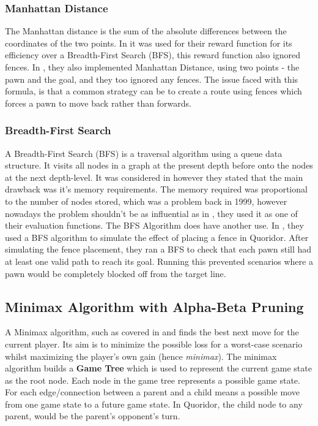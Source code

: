 \documentclass[review]{cmpreport}
\begin{document}
\subsubsection{Manhattan Distance}
The Manhattan distance is the sum of the absolute differences between the coordinates of the two points. In \cite{josequoridor} it was used for their reward function for its efficiency over a Breadth-First Search (BFS), this reward function also ignored fences. In \cite{glendenning2005mastering}, they also implemented Manhattan Distance, using two points - the pawn and the goal, and they too ignored any fences. The issue faced with this formula, is that a common strategy can be to create a route using fences which forces a pawn to move back rather than forwards.

\subsubsection{Breadth-First Search}
A Breadth-First Search (BFS) is a traversal algorithm using a queue data structure. It visits all nodes in a graph at the present depth before onto the nodes at the next depth-level. It was considered in \cite{korf1999artificial} however they stated that the main drawback was it's memory requirements. The memory required was proportional to the number of nodes stored, which was a problem back in 1999, however nowadays the problem shouldn't be as influential as in \cite{josequoridor}, they used it as one of their evaluation functions. The BFS Algorithm does have another use. In \cite{respall2018monte}, they used a BFS algorithm to simulate the effect of placing a fence in Quoridor. After simulating the fence placement, they ran a BFS to check that each pawn still had at least one valid path to reach its goal. Running this prevented scenarios where a pawn would be completely blocked off from the target line.

\subsection{Minimax Algorithm with Alpha-Beta Pruning}
A Minimax algorithm, such as covered in \cite{plaat1996best} and \cite{strong2011minimax} finds the best next move for the current player. Its aim is to minimize the possible loss for a worst-case scenario whilst maximizing the player's own gain (hence \textit{minimax}). The minimax algorithm builds a \textbf{Game Tree} which is used to represent the current game state as the root node. Each node in the game tree represents a possible game state. For each edge/connection between a parent and a child means a possible move from one game state to a future game state. In Quoridor, the child node to any parent, would be the parent's opponent's turn.\newline
\end{document}
